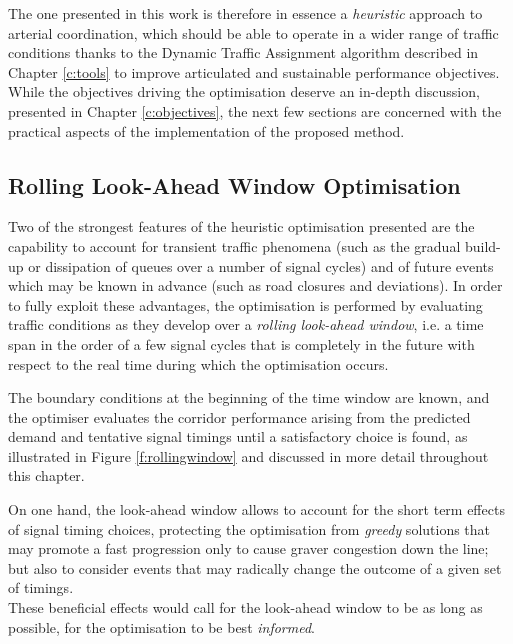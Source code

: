 The one presented in this work is therefore in essence a \emph{heuristic} approach to arterial coordination, which should be able to operate in a wider range of traffic conditions thanks to the Dynamic Traffic Assignment algorithm described in Chapter \ref{c:tools} to improve articulated and sustainable performance objectives. While the objectives driving the optimisation deserve an in-depth discussion, presented in Chapter \ref{c:objectives}, the next few sections are concerned with the practical aspects of the implementation of the proposed method.



\subsection{Rolling Look-Ahead Window Optimisation}
Two of the strongest features of the heuristic optimisation presented are the capability to account for transient traffic phenomena (such as the gradual build-up or dissipation of queues over a number of signal cycles) and of future events which may be known in advance (such as road closures and deviations). In order to fully exploit these advantages, the optimisation is performed by evaluating traffic conditions as they develop over a \emph{rolling look-ahead window}, i.e. a time span in the order of a few signal cycles that is completely in the future with respect to the real time during which the optimisation occurs.

The boundary conditions at the beginning of the time window are known, and the optimiser evaluates the corridor performance arising from the predicted demand and tentative signal timings until a satisfactory choice is found, as illustrated in Figure \ref{f:rollingwindow} and discussed in more detail throughout this chapter.

On one hand, the look-ahead window allows to account for the short term effects of signal timing choices, protecting the optimisation from \emph{greedy} solutions that may promote a fast progression only to cause graver congestion down the line; but also to consider events that may radically change the outcome of a given set of timings.\\
These beneficial effects would call for the look-ahead window to be as long as possible, for the optimisation to be best \emph{informed}.

